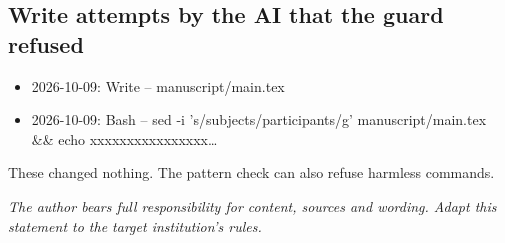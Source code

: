\subsection*{Write attempts by the AI that the guard refused}
\begin{itemize}
  \item 2026-10-09: Write – manuscript/main.tex
  \item 2026-10-09: Bash – sed -i 's/subjects/participants/g' manuscript/main.tex \&\& echo xxxxxxxxxxxxxxxx…
\end{itemize}
These changed nothing. The pattern check can also refuse harmless commands.

\textit{The author bears full responsibility for content, sources and wording. Adapt this statement to the target institution's rules.}
